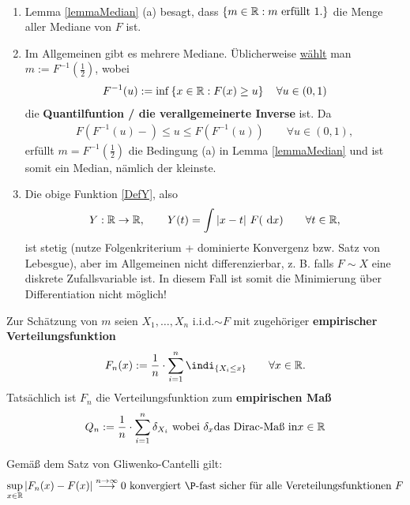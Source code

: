 \begin{bemerkungnr}\
	\begin{enumerate}
		\item Lemma \ref{lemmaMedian} (a) besagt, dass $\lbrace m\in\mathbb{R}: m\text{ erfüllt } 1.\rbrace$ die Menge aller Mediane von $F$ ist.
		\item Im Allgemeinen gibt es mehrere Mediane. Üblicherweise \underline{wählt} man $m:=F^{-1}(\frac{1}{2})$, wobei
		\begin{align*}
			F^{-1}(u):=\inf\left\lbrace x\in\mathbb{R}:F(x)\geq u\right\rbrace\quad\forall u\in (0,1)
		\end{align*}
		die \textbf{Quantilfuntion / die verallgemeinerte Inverse} ist. Da
		\begin{align*}
			F\left(F^{-1}(u)-\right)\leq u\leq F\left(F^{-1}(u)\right)\qquad\forall u\in (0,1),
		\end{align*}
		erfüllt $m=F^{-1}\left(\frac{1}{2}\right)$ die Bedingung (a) in Lemma \ref{lemmaMedian} und ist somit ein Median, nämlich der kleinste.
		\item Die obige Funktion \eqref{DefY}, also
		\begin{align*}
			Y:\mathbb{R}\to\mathbb{R},\qquad Y(t)=\int\limits|x-t|~F(\text{ d} x)\qquad\forall t\in\mathbb{R},
		\end{align*}
		ist stetig (nutze Folgenkriterium + dominierte Konvergenz bzw. Satz von Lebesgue), aber im Allgemeinen nicht differenzierbar, z. B. falls $F\sim X$ 		eine diskrete Zufallsvariable ist. In diesem Fall ist somit die Minimierung über Differentiation nicht möglich!
	\end{enumerate}
\end{bemerkungnr}

Zur Schätzung von $m$ seien $X_1,\ldots, X_n$ i.i.d.$\sim F$ mit zugehöriger \textbf{empirischer Verteilungsfunktion}
\begin{align*}
	F_n(x):=\frac{1}{n}\cdot\sum\limits_{i=1}^n\indi_{\lbrace X_i\leq x\rbrace}\qquad\forall x\in\R.
\end{align*}
Tatsächlich ist $F_n$ die Verteilungsfunktion zum \textbf{empirischen Maß}
\begin{align*}
	Q_n:=\frac{1}{n}\cdot\sum\limits_{i=1}^n\delta_{X_i}\text{ wobei }\delta_x\text {das Dirac-Maß in}x\in\mathbb{R}
\end{align*}

Gemäß dem Satz von Gliwenko-Cantelli gilt:
\begin{align*}
	\sup\limits_{x\in\R}|F_n(x)-F(x)|\stackrel{n\to\infty}{\longrightarrow}0\text{ konvergiert $\P$-fast sicher für alle Vereteilungsfunktionen }F
\end{align*}

